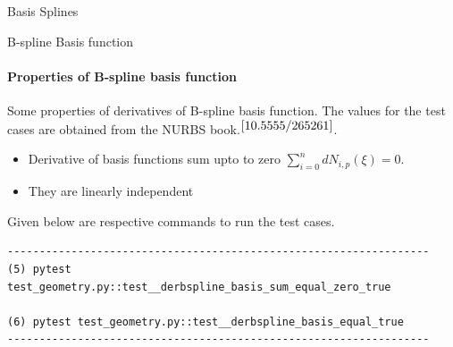\documentclass[a4paper,12pt,times]{article}
\begin{document}
\begin{section}{Basis Splines}
\begin{subsection}{B-spline Basis function}
\paragraph{Properties of B-spline basis function}
Some properties of derivatives of B-spline basis function. The values for the test cases are obtained from the NURBS book.$^{\cite{10.5555/265261}}$.
 
\begin{itemize}
\item Derivative of basis functions sum upto to zero $\sum_{i=0}^{n}d N_{i, p}(\xi)=0$.

\item They are linearly independent

\end{itemize}
Given below are respective commands to run the test cases.
\begin{verbatim} 
------------------------------------------------------------------
(5) pytest test_geometry.py::test__derbspline_basis_sum_equal_zero_true

(6) pytest test_geometry.py::test__derbspline_basis_equal_true
------------------------------------------------------------------
\end{verbatim}
\end{subsection}


\end{section}
\end{document}
